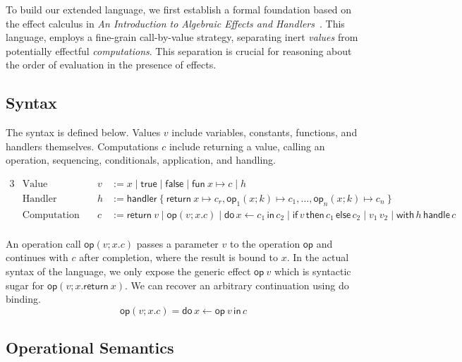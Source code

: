 \documentclass{article}
\theoremstyle{definition}
\theoremstyle{remark}
\newcommand\true{\mathsf{true}}
\newcommand\false{\mathsf{false}}
\newcommand\fun[2]{{\mathsf{fun} \ #1 \mapsto #2}}
\newcommand\handler[1]{{\mathsf{handler} \ \{ \ #1 \ \}}}
\newcommand\ret[1]{{\mathsf{return} \ #1}}
\newcommand\op{\mathsf{op}}
\newcommand{\doin}[3]{\mathsf{do}\, #1 \leftarrow #2\, \mathsf{in}\, #3}
\newcommand{\ifelse}[3]{\mathsf{if}\, #1 \,\mathsf{then} \,#2\, \mathsf{else}\, #3}
\newcommand{\with}[2]{\mathsf{with}\, #1 \,\mathsf{handle} \,#2}
\newcommand{\app}[2]{{#1 \, #2}}
\begin{document}
To build our extended language, we first establish a formal foundation based on the effect calculus in \emph{An Introduction to Algebraic Effects and Handlers}~\cite{pretnar_introduction_2015}.
This language, employs a fine-grain call-by-value strategy, separating inert \emph{values} from potentially effectful \emph{computations}.
This separation is crucial for reasoning about the order of evaluation in the presence of effects.

\subsection{Syntax}

The syntax is defined below. Values $v$ include variables, constants, functions, and handlers themselves.
Computations $c$ include returning a value, calling an operation, sequencing, conditionals, application, and handling.

\begin{alignat*}{3}
  &\text{Value} \quad & v &:= x \mid \true \mid \false \mid \fun x c \mid h \\
  &\text{Handler} \quad & h &:= \handler{ \ret{x} \mapsto c_r, \op_1(x;k) \mapsto c_1, \dots, \op_n(x;k) \mapsto c_n } \\
  &\text{Computation} \quad & c &:= \ret{v} \mid \op(v; x.c) \mid \doin{x}{c_1}{c_2} \mid \ifelse{v}{c_1}{c_2} \mid \app{v_1}{v_2} \mid \with{h}{c} \\
\end{alignat*}

An operation call $\op(v; x.c)$ passes a parameter $v$ to the operation $\op$ and continues with $c$ after completion, where the result is bound to $x$.
In the actual syntax of the language, we only expose the generic effect $\op \ v$ which is syntactic sugar for $\op(v; x.\ret{x})$.
We can recover an arbitrary continuation using do binding.
\[
  \op(v; x.c) = \doin{x}{\op \ v}{c}
\]

\subsection{Operational Semantics}
\end{document}
